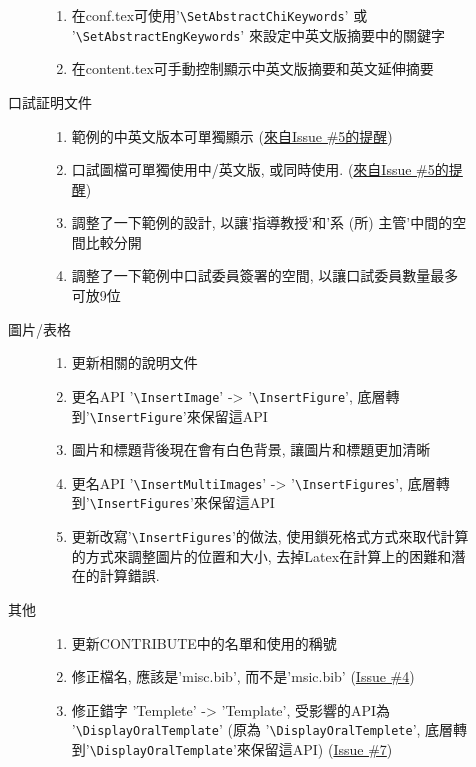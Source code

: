 \begin{description}
\begin{description}
\begin{enumerate}
          \item 在conf.tex可使用'\verb|\SetAbstractChiKeywords|' 或 '\verb|\SetAbstractEngKeywords|' 來設定中英文版摘要中的關鍵字
          \item 在content.tex可手動控制顯示中英文版摘要和英文延伸摘要
        \end{enumerate}
      \item[口試証明文件] \hfill
        \begin{enumerate}
          \item 範例的中英文版本可單獨顯示 (\href{https://github.com/wengan-li/ncku-thesis-template-latex/issues/5}{來自Issue \#5的提醒})
          \item 口試圖檔可單獨使用中/英文版, 或同時使用. (\href{https://github.com/wengan-li/ncku-thesis-template-latex/issues/5}{來自Issue \#5的提醒})
          \item 調整了一下範例的設計, 以讓'指導教授'和'系 (所) 主管'中間的空間比較分開
          \item 調整了一下範例中口試委員簽署的空間, 以讓口試委員數量最多可放9位
        \end{enumerate}
      \item[圖片/表格] \hfill
        \begin{enumerate}
          \item 更新相關的說明文件
          \item 更名API '\verb|\InsertImage|' -> '\verb|\InsertFigure|', 底層轉到'\verb|\InsertFigure|'來保留這API
          \item 圖片和標題背後現在會有白色背景, 讓圖片和標題更加清晰
          \item 更名API '\verb|\InsertMultiImages|' -> '\verb|\InsertFigures|', 底層轉到'\verb|\InsertFigures|'來保留這API
          \item 更新改寫'\verb|\InsertFigures|'的做法, 使用鎖死格式方式來取代計算的方式來調整圖片的位置和大小, 去掉Latex在計算上的困難和潛在的計算錯誤.
        \end{enumerate}
      \item[其他] \hfill
        \begin{enumerate}
          \item 更新CONTRIBUTE中的名單和使用的稱號
          \item 修正檔名, 應該是'misc.bib', 而不是'msic.bib' (\href{https://github.com/wengan-li/ncku-thesis-template-latex/issues/4}{Issue \#4})
          \item 修正錯字 'Templete' -> 'Template', 受影響的API為 '\verb|\DisplayOralTemplate|' (原為 '\verb|\DisplayOralTemplete|', 底層轉到'\verb|\DisplayOralTemplate|'來保留這API) (\href{https://github.com/wengan-li/ncku-thesis-template-latex/issues/7}{Issue \#7})

\end{enumerate}
\end{description}
\end{description}
